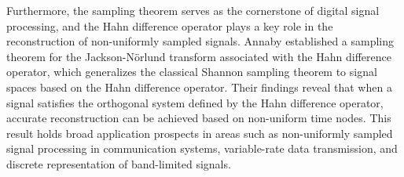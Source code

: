 \documentclass[sn-mathphys-num]{sn-jnl}%
\theoremstyle{thmstyleone}%
\theoremstyle{thmstyletwo}%
\theoremstyle{thmstylethree}%
\begin{document}
Furthermore, the sampling theorem serves as the cornerstone of digital signal processing, and the Hahn difference operator plays a key role in the reconstruction of non-uniformly sampled signals. Annaby \cite{Anna} established a sampling theorem for the Jackson-N\"orlund transform associated with the Hahn difference operator, which generalizes the classical Shannon sampling theorem to signal spaces based on the Hahn difference operator. Their findings reveal that when a signal satisfies the orthogonal system defined by the Hahn difference operator, accurate reconstruction can be achieved based on non-uniform time nodes. This result holds broad application prospects in areas such as non-uniformly sampled signal processing in communication systems, variable-rate data transmission, and discrete representation of band-limited signals.
\end{document}
